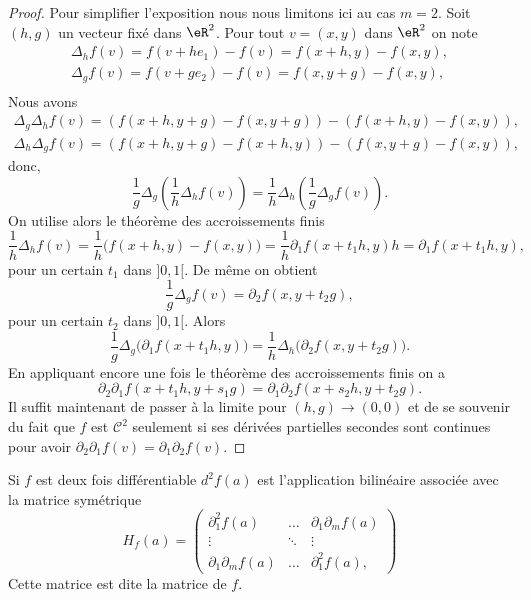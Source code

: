 \begin{proof}
  Pour simplifier l'exposition nous nous limitons ici au cas $m=2$. Soit $(h,g)$ un vecteur fixé dans $\eR^2$. Pour tout  $v=(x,y)$ dans $\eR^2$ on note
  \begin{equation}
    \begin{array}{c}
      \Delta_h f(v)=f(v+he_1) -f(v) = f(x+h,y)-f(x,y),\\ 
      \Delta_g f(v)=f(v+ge_2) -f(v) = f(x,y+g)-f(x,y),\\ 
    \end{array}
  \end{equation}
Nous avons
\begin{equation}
  \begin{array}{c}
   \Delta_g   \Delta_h f(v)=\left(f(x+h,y+g)-f(x,y+g)\right)-\left(f(x+h,y)-f(x,y)\right),\\
   \Delta_h   \Delta_g f(v)=\left(f(x+h,y+g)-f(x+h,y)\right)-\left(f(x,y+g)-f(x,y)\right),
  \end{array}
\end{equation}
donc, 
\begin{equation}
  \frac{1}{g} \Delta_g  \left(\frac{1}{h} \Delta_h f(v)\right) = \frac{1}{h} \Delta_h \left(\frac{1}{g} \Delta_g f(v)\right).
\end{equation}
On utilise alors le théorème des accroissements finis
\[
\frac{1}{h} \Delta_h f(v)=\frac{1}{h}\big(f(x+h,y)-f(x,y)\big)=\frac{1}{h}\partial_1f(x+t_1h,y )h=\partial_1f(x+t_1h, y),
\]
pour un certain $t_1$ dans $]0,1[$. De même on obtient 
\[
\frac{1}{g} \Delta_g f(v)= \partial_2 f(x, y+t_2g),
\]
pour un certain $t_2$ dans $]0,1[$. Alors
 \begin{equation}
  \frac{1}{g} \Delta_g  \big(\partial_1f(x+t_1h, y)\big) = \frac{1}{h} \Delta_h \big(\partial_2 f(x, y+t_2g)\big).
\end{equation}
En appliquant encore une fois le théorème des accroissements finis on a
 \begin{equation}
  \partial_2\partial_1f(x+t_1h, y+s_1g) = \partial_1\partial_2 f(x+s_2h, y+t_2g).
\end{equation} 
Il suffit maintenant de passer à la limite pour $(h,g) \to (0,0)$ et de se souvenir du fait que $f$ est $\mathcal{C}^2$ seulement si ses dérivées partielles secondes sont continues pour avoir $\partial_2\partial_1f(v)=\partial_1\partial_2 f(v)$.
\end{proof}
Si $f$ est deux fois différentiable $d^2f(a)$ est l'application bilinéaire associée avec la matrice symétrique
\begin{equation}
 H_f(a)= \begin{pmatrix}
    \partial^2_1f(a)& \ldots& \partial_1\partial_m f(a)\\
    \vdots& \ddots& \vdots\\
    \partial_1\partial_m f(a)&\ldots&\partial^2_1f(a),
  \end{pmatrix}
\end{equation}
Cette matrice est dite la matrice  de $f$. 

